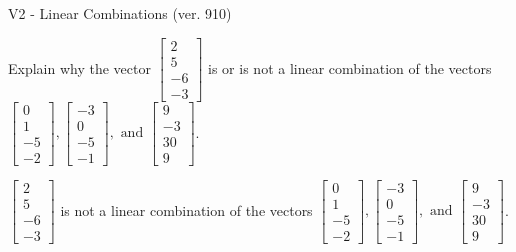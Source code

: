 \begin{exercise}
  \begin{exerciseTitle}V2 - Linear Combinations (ver. 910)\end{exerciseTitle}
  \begin{exerciseStatement}
    Explain why the vector \(\left[\begin{array}{c}
2 \\
5 \\
-6 \\
-3
\end{array}\right]\)  is or is not a linear 
	combination of the vectors \(\left[\begin{array}{c}
0 \\
1 \\
-5 \\
-2
\end{array}\right] , \left[\begin{array}{c}
-3 \\
0 \\
-5 \\
-1
\end{array}\right] , \text{ and } \left[\begin{array}{c}
9 \\
-3 \\
30 \\
9
\end{array}\right]\).
	


  \end{exerciseStatement}
  \begin{exerciseAnswer}
   \(\left[\begin{array}{c}
2 \\
5 \\
-6 \\
-3
\end{array}\right]\) 
  	 is not  
	a linear combination of the vectors \(\left[\begin{array}{c}
0 \\
1 \\
-5 \\
-2
\end{array}\right] , \left[\begin{array}{c}
-3 \\
0 \\
-5 \\
-1
\end{array}\right] , \text{ and } \left[\begin{array}{c}
9 \\
-3 \\
30 \\
9
\end{array}\right]\).

	
  


  \end{exerciseAnswer}
\end{exercise}
